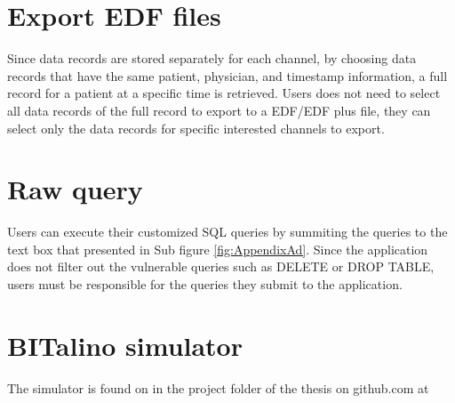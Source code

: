 \section{Export EDF files}
Since data records are stored separately for each channel, by choosing data records that have the same patient, physician, and timestamp information, a full record for a patient at a specific time is retrieved. Users does not need to select all data records of the full record to export to a EDF/EDF plus file, they can select only the data records for specific interested channels to export.
\section{Raw query}
Users can execute their customized SQL queries by summiting the queries to the text box that presented in Sub figure \ref{fig:AppendixAd}. Since the application does not filter out the vulnerable queries such as DELETE or DROP TABLE, users must be responsible for the queries they submit to the application.
\section{BITalino simulator}
The simulator is found on in the project folder of the thesis on github.com at 